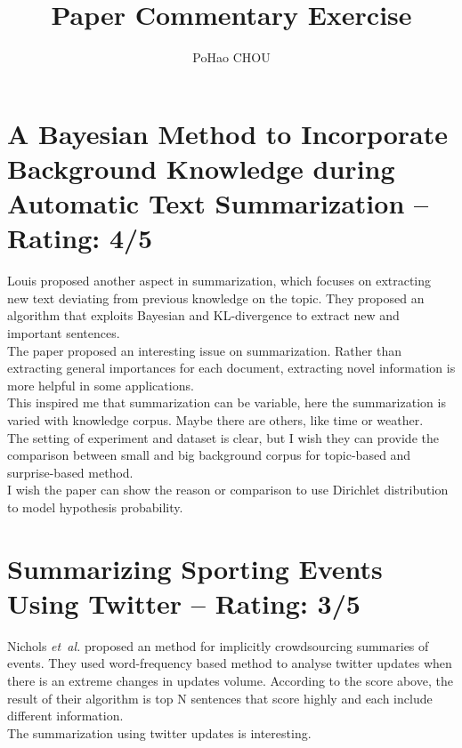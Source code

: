 \documentclass[a4paper]{article}
\title{Paper Commentary Exercise}
\author{PoHao CHOU}
\begin{document}
\maketitle
\section{A Bayesian Method to Incorporate Background Knowledge during Automatic Text Summarization -- Rating: 4/5}
Louis \cite{Louis:ACL14} proposed another aspect in summarization, which focuses on extracting new text deviating from previous knowledge on the topic. They proposed an algorithm that exploits Bayesian and KL-divergence to extract new and important sentences.\\

The paper proposed an interesting issue on summarization. Rather than extracting general importances for each document, extracting novel information is more helpful in some applications.\\

This inspired me that summarization can be variable, here the summarization is varied with knowledge corpus. Maybe there are others, like time or weather.\\ 

The setting of experiment and dataset is clear, but I wish they can provide the comparison between small and big background corpus for topic-based and surprise-based method.\\

I wish the paper can show the reason or comparison to use Dirichlet distribution to model hypothesis probability.


\section{Summarizing Sporting Events Using Twitter -- Rating: 3/5}
Nichols \emph{et~al.} \cite{Nichols:IUI12} proposed an method for implicitly crowdsourcing summaries of events. They used word-frequency based method to analyse twitter updates when there is an extreme changes in updates volume. According to the score above, the result of their algorithm is top N sentences that score highly and each include different information.\\

The summarization using twitter updates is interesting.\\
\end{document}
